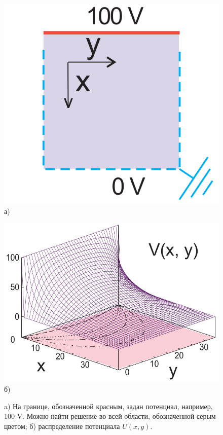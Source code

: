 \documentclass[12pt]{article}
\begin{document}
\begin{figure}
\begin{minipage}{0.49\linewidth}
\begin{center}
\includegraphics[width=0.9\linewidth]{./figs/01.png}\\
а)
\end{center}
\end{minipage}
\begin{minipage}{0.49\linewidth}
\begin{center}
\includegraphics[width=1.1\linewidth]{./figs/02.png}\\
б)
\end{center}
\end{minipage}
\caption{a) На границе, обозначенной красным, задан потенциал, например, 100 V. Можно найти решение во всей области, обозначенной серым цветом; б) распределение потенциала $U(x,y)$.}
\label{fig:simple}
\end{figure}
\end{document}
